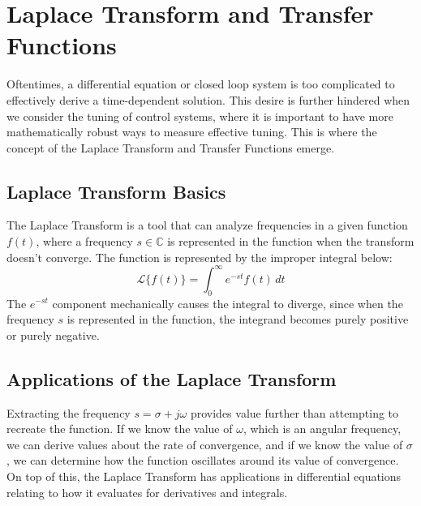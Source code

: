 \documentclass[journal]{IEEEtran}
\begin{document}
\section{Laplace Transform and Transfer Functions}

Oftentimes, a differential equation or closed loop system is too complicated to effectively derive a time-dependent solution. 
This desire is further hindered when we consider the tuning of control systems, 
where it is important to have more mathematically robust ways to measure effective tuning. 
This is where the concept of the Laplace Transform and Transfer Functions emerge. 

\subsection{Laplace Transform Basics}

The Laplace Transform is a tool that can analyze frequencies in a given function $f(t)$, 
where a frequency $s \in \mathbb{C}$ 
is represented in the function when the transform doesn't converge. 
The function is represented by the improper integral below:
\begin{equation}
\mathcal{L}\{f(t)\} = \int_{0}^{\infty} e^{-st}f(t)\,dt
\end{equation}
The $e^{-st}$ component mechanically causes the integral to diverge, since when the frequency $s$ is represented in the function, 
the integrand becomes purely positive or purely negative.

\subsection{Applications of the Laplace Transform}

Extracting the frequency $s = \sigma + j \omega$ provides value further than attempting to recreate the function. 
If we know the value of $\omega$, which is an angular frequency, we can derive values about the rate of convergence, 
and if we know the value of $\sigma$, we can determine how the function oscillates around its value of convergence. 
On top of this, the Laplace Transform has applications in differential equations relating to how it evaluates for derivatives and integrals. 
\end{document}
